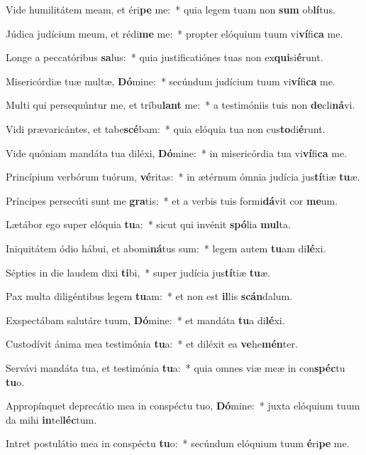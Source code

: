 \item Vide humilitátem meam, et éri\textbf{pe} me:~* quia legem tuam non \textbf{sum} ob\textbf{lí}tus.
\item Júdica judícium meum, et rédi\textbf{me} me:~* propter elóquium tuum vi\textbf{ví}fi\textbf{ca} me.
\item Longe a peccatóribus \textbf{sa}lus:~* quia justificatiónes tuas non ex\textbf{qui}si\textbf{é}runt.
\item Misericórdiæ tuæ multæ, \textbf{Dó}mine:~* secúndum judícium tuum vi\textbf{ví}fi\textbf{ca} me.
\item Multi qui persequúntur me, et tríbu\textbf{lant} me:~* a testimóniis tuis non \textbf{de}cli\textbf{ná}vi.
\item Vidi prævaricántes, et tabe\textbf{scé}bam:~* quia elóquia tua non cus\textbf{to}di\textbf{é}runt.
\item Vide quóniam mandáta tua diléxi, \textbf{Dó}mine:~* in misericórdia tua vi\textbf{ví}fi\textbf{ca} me.
\item Princípium verbórum tuórum, \textbf{vé}ritas:~* in ætérnum ómnia judícia jus\textbf{tí}tiæ \textbf{tu}æ.
\item Príncipes persecúti sunt me \textbf{gra}tis:~* et a verbis tuis formi\textbf{dá}vit cor \textbf{me}um.
\item Lætábor ego super elóquia \textbf{tu}a:~* sicut qui invénit \textbf{spó}lia \textbf{mul}ta.
\item Iniquitátem ódio hábui, et abomi\textbf{ná}tus sum:~* legem autem \textbf{tu}am di\textbf{lé}xi.
\item Sépties in die laudem dixi \textbf{ti}bi,~* super judícia jus\textbf{tí}tiæ \textbf{tu}æ.
\item Pax multa diligéntibus legem \textbf{tu}am:~* et non est \textbf{il}lis \textbf{scán}dalum.
\item Exspectábam salutáre tuum, \textbf{Dó}mine:~* et mandáta \textbf{tu}a di\textbf{lé}xi.
\item Custodívit ánima mea testimónia \textbf{tu}a:~* et diléxit ea \textbf{ve}he\textbf{mén}ter.
\item Servávi mandáta tua, et testimónia \textbf{tu}a:~* quia omnes viæ meæ in con\textbf{spéc}tu \textbf{tu}o.
\item Appropínquet deprecátio mea in conspéctu tuo, \textbf{Dó}mine:~* juxta elóquium tuum da mihi \textbf{in}tel\textbf{léc}tum.
\item Intret postulátio mea in conspéctu \textbf{tu}o:~* secúndum elóquium tuum \textbf{é}ri\textbf{pe} me.
